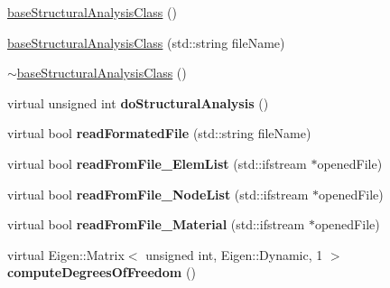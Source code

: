 \begin{DoxyCompactItemize}
\item 
\mbox{\hyperlink{classbase_structural_analysis_class_a743a6d6c9b29ce5c7e299ed246691b9a}{base\+Structural\+Analysis\+Class}} ()
\item 
\mbox{\hyperlink{classbase_structural_analysis_class_ac51091bf5f718cdc746c20d9cd5a0cab}{base\+Structural\+Analysis\+Class}} (std\+::string file\+Name)
\item 
\mbox{\hyperlink{classbase_structural_analysis_class_a70a5a3407cdeb6f32f69fb1fd7ba6e75}{$\sim$base\+Structural\+Analysis\+Class}} ()
\item 
\mbox{\label{classbase_structural_analysis_class_adea296e2d4cafa290794599b62e2abdd}} 
virtual unsigned int {\bfseries do\+Structural\+Analysis} ()
\item 
\mbox{\label{classbase_structural_analysis_class_aa21d6e5d9eea16e4fb57845d93d1ec4b}} 
virtual bool {\bfseries read\+Formated\+File} (std\+::string file\+Name)
\item 
\mbox{\label{classbase_structural_analysis_class_a57fe62169a4032b8c8393d9adb058343}} 
virtual bool {\bfseries read\+From\+File\+\_\+\+Elem\+List} (std\+::ifstream $\ast$opened\+File)
\item 
\mbox{\label{classbase_structural_analysis_class_ad81d20f7c98e21692e68db5019d0e8ae}} 
virtual bool {\bfseries read\+From\+File\+\_\+\+Node\+List} (std\+::ifstream $\ast$opened\+File)
\item 
\mbox{\label{classbase_structural_analysis_class_aa1ca226998df962bc3ea65513da9b938}} 
virtual bool {\bfseries read\+From\+File\+\_\+\+Material} (std\+::ifstream $\ast$opened\+File)
\item 
\mbox{\label{classbase_structural_analysis_class_aca53b1f1642a1dae799df8f906479f93}} 
virtual Eigen\+::\+Matrix$<$ unsigned int, Eigen\+::\+Dynamic, 1 $>$ {\bfseries compute\+Degrees\+Of\+Freedom} ()
\item 
\mbox{\label{classbase_structural_analysis_class_a773fa080feae6b17e47e58e5ed810885}} 

\end{DoxyCompactItemize}
